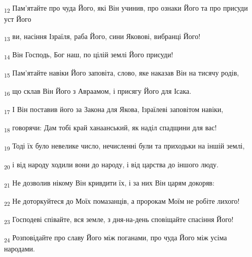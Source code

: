 \begin{tcolorbox}
\textsubscript{12} Пам'ятайте про чуда Його, які Він учинив, про ознаки Його та про присуди уст Його
\end{tcolorbox}
\begin{tcolorbox}
\textsubscript{13} ви, насіння Ізраїля, раба Його, сини Яковові, вибранці Його!
\end{tcolorbox}
\begin{tcolorbox}
\textsubscript{14} Він Господь, Бог наш, по цілій землі Його присуди!
\end{tcolorbox}
\begin{tcolorbox}
\textsubscript{15} Пам'ятайте навіки Його заповіта, слово, яке наказав Він на тисячу родів,
\end{tcolorbox}
\begin{tcolorbox}
\textsubscript{16} що склав Він Його з Авраамом, і присягу Його для Ісака.
\end{tcolorbox}
\begin{tcolorbox}
\textsubscript{17} І Він поставив його за Закона для Якова, Ізраїлеві заповітом навіки,
\end{tcolorbox}
\begin{tcolorbox}
\textsubscript{18} говорячи: Дам тобі край ханаанський, як наділ спадщини для вас!
\end{tcolorbox}
\begin{tcolorbox}
\textsubscript{19} Тоді їх було невелике число, нечисленні були та приходьки на іншій землі,
\end{tcolorbox}
\begin{tcolorbox}
\textsubscript{20} і від народу ходили вони до народу, і від царства до іншого люду.
\end{tcolorbox}
\begin{tcolorbox}
\textsubscript{21} Не дозволив нікому Він кривдити їх, і за них Він царям докоряв:
\end{tcolorbox}
\begin{tcolorbox}
\textsubscript{22} Не доторкуйтеся до Моїх помазанців, а пророкам Моїм не робіте лихого!
\end{tcolorbox}
\begin{tcolorbox}
\textsubscript{23} Господеві співайте, вся земле, з дня-на-день сповіщайте спасіння Його!
\end{tcolorbox}
\begin{tcolorbox}
\textsubscript{24} Розповідайте про славу Його між поганами, про чуда Його між усіма народами.
\end{tcolorbox}
